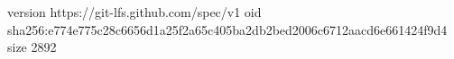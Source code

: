 version https://git-lfs.github.com/spec/v1
oid sha256:e774e775c28c6656d1a25f2a65c405ba2db2bed2006c6712aacd6e661424f9d4
size 2892
